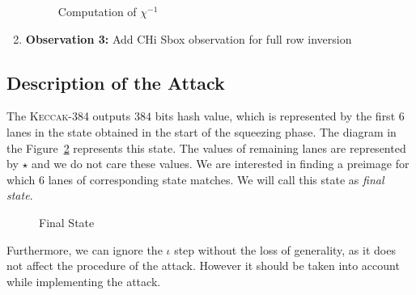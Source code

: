 \documentclass[runningheads]{llncs}
\newcommand{\Keccak}{\mbox{\textsc{Keccak}}}
\begin{document}
\begin{enumerate}
\begin{figure}[ht]
\begin{center}
\end{center}
\caption{Computation of $\chi^{-1}$\label{chi_inv2}}
\end{figure}

\item \label{ob3}\textbf{Observation 3:} Add CHi Sbox observation for full row inversion
\end{enumerate}


\subsection{Description of the Attack}
The \Keccak-{384} outputs $384$ bits hash value, which is represented by the first $6$ lanes in the state obtained in the start of the squeezing phase. The diagram in the Figure~\ref{initial_sq} represents this state. The values of remaining lanes are represented by $\star$ and we do not care these values. We are interested in finding a preimage for which $6$ lanes of corresponding state matches. We will call this state as \emph{final state}.
\begin{figure}[ht]
\begin{center}
\end{center}
\caption{Final State\label{initial_sq}}
\end{figure}
Furthermore, we can ignore the {$\iota$} step without the loss of generality, as it does not affect the procedure of the attack. However it should be taken into account while implementing the attack.
\end{document}
